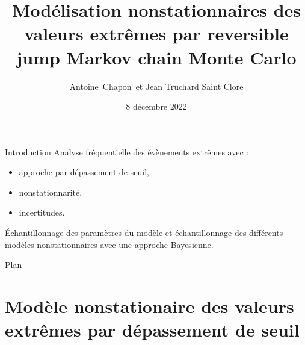 \documentclass[aspectratio=169]{beamer}
\date{8 décembre 2022}
\title{Modélisation nonstationnaires des valeurs extrêmes par reversible jump Markov chain Monte Carlo}
\author{Antoine~Chapon~et Jean Truchard Saint Clore}
\institute[Universities of Somewhere and Elsewhere] %
{
  cours ETE 405
 }
\begin{document}
\begin{frame}
  \titlepage
\end{frame}



\section*{}

\begin{frame}{Introduction}
Analyse fréquentielle des évènements extrêmes avec :
\vspace{0.5cm}
\begin{itemize}
\setlength{\itemsep}{10pt}
	\item approche par dépassement de seuil,
	\item nonstationnarité,
	\item incertitudes.
\end{itemize}
\vspace{0.5cm}
Échantillonnage des paramètres du modèle et échantillonnage des différents modèles nonstationnaires avec une approche Bayesienne.
\end{frame}

\begin{frame}{Plan}
\tableofcontents
\end{frame}


\section{Modèle nonstationaire des valeurs extrêmes par dépassement de seuil}
\end{document}
